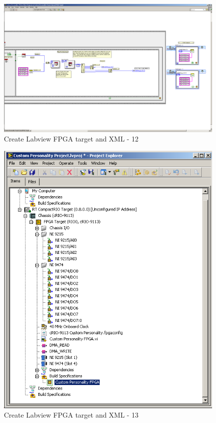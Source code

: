 \documentclass[a4paper,twoside,english]{report}
\begin{document}
\begin{figure}[!h]
\centering \includegraphics[angle=-90,scale=0.45]{Screenshots/Screenshot_2015-01-16_20-07-43.png}
\caption{Create Labview FPGA target and XML - 12}

\label{fig: Create Labview FPGA target and XML-12} 
\end{figure}

\begin{figure}[!h]
\centering \includegraphics[scale=0.45]{Screenshots/Screenshot_2015-01-16_19-52-25.png}
\caption{Create Labview FPGA target and XML - 13}

\label{fig: Create Labview FPGA target and XML-13} 
\end{figure}
\end{document}
